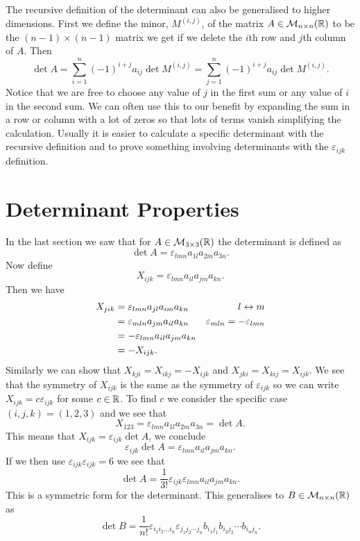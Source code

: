 The recursive definition of the determinant can also be generalised to higher dimensions.
First we define the minor, \(M^{(i, j)}\), of the matrix \(A\in\mathcal{M}_{{n}\times{n}}({\mathbb{R}})\) to be the \((n-1)\times(n-1)\) matrix we get if we delete the \(i\)th row and \(j\)th column of \(A\).
Then
\[\det A = \sum_{i=1}^n (-1)^{i + j}a_{ij}\det M^{(i, j)} = \sum_{j=1}^{n} (-1)^{i+j} a_{ij}\det M^{(i, j)}.\]
Notice that we are free to choose any value of \(j\) in the first sum or any value of \(i\) in the second sum.
We can often use this to our benefit by expanding the sum in a row or column with a lot of zeros so that lots of terms vanish simplifying the calculation.
Usually it is easier to calculate a specific determinant with the recursive definition and to prove something involving determinants with the \(\varepsilon_{ijk}\) definition.

\section{Determinant Properties}
In the last section we saw that for \(A\in\mathcal{M}_{{3}\times{3}}({\mathbb{R}})\) the determinant is defined as
\[\det A = \varepsilon_{lmn}a_{1l}a_{2m}a_{3n}.\]
Now define
\[X_{ijk} = \varepsilon_{lmn}a_{il}a_{jm}a_{kn}.\]
Then we have
\begin{align*}
    X_{jik} &= \varepsilon_{lmn}a_{jl}a_{im}a_{kn} & {l} \leftrightarrow {m}\\
    &= \varepsilon_{mln}a_{jm}a_{il}a_{kn} & \varepsilon_{mln} = -\varepsilon_{lmn}\\
    &= -\varepsilon_{lmn}a_{il}a_{jm}a_{kn}\\
    &= -X_{ijk}.
\end{align*}
Similarly we can show that \(X_{kji} = X_{ikj} = -X_{ijk}\) and \(X_{jki} = X_{kij} = X_{ijk}\).
We see that the symmetry of \(X_{ijk}\) is the same as the symmetry of \(\varepsilon_{ijk}\) so we can write \(X_{ijk} = c\varepsilon_{ijk}\) for some \(c\in\mathbb{R}\).
To find \(c\) we consider the specific case \((i, j, k) = (1, 2, 3)\) and we see that
\[X_{123} = \varepsilon_{lmn}a_{1l}a_{2m}a_{3n} = \det A.\]
This means that \(X_{ijk} = \varepsilon_{ijk}\det A\), we conclude
\[\varepsilon_{ijk}\det A = \varepsilon_{lmn}a_{il}a_{jm}a_{kn}.\]
If we then use \(\varepsilon_{ijk}\varepsilon_{ijk} = 6\) we see that
\[\det A = \frac{1}{3!}\varepsilon_{ijk}\varepsilon_{lmn}a_{il}a_{jm}a_{kn}.\]
This is a symmetric form for the determinant.
This generalises to \(B\in\mathcal{M}_{{n}\times{n}}({\mathbb{R}})\) as
\[\det B = \frac{1}{n!}\varepsilon_{i_1i_2\dots i_n}\varepsilon_{j_1j_2\dotsm j_n}b_{i_1j_1}b_{i_2j_2}\dotsm b_{i_nj_n}.\]

